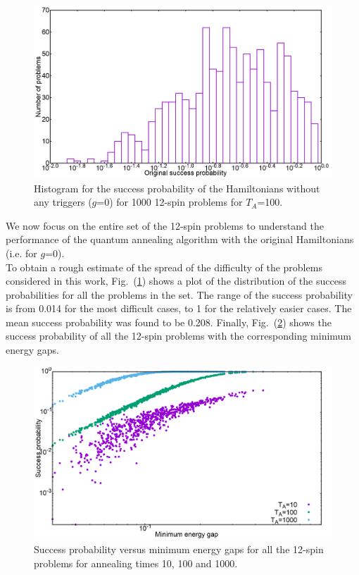 \documentclass[../main.tex]{subfiles}
\begin{document}
\begin{figure}[H]
\centering 
\includegraphics[scale=0.24]{O_s12_T100_g0.png}
\caption{Histogram for the success probability of the Hamiltonians without any triggers ($g$=0) for 1000 12-spin problems for $T_A$=100.}
\label{fig:o8}
\end{figure}
We now focus on the entire set of the 12-spin problems to understand the performance of the quantum annealing algorithm with the original Hamiltonians (i.e. for $g$=0).\\
To obtain a rough estimate of the spread of the difficulty of the problems considered in this work, Fig.~(\ref{fig:o8}) shows a plot of the distribution of the success probabilities for all the problems in the set. The range of the success probability is from 0.014 for the most difficult cases, to 1 for the relatively easier cases. The mean success probability was found to be 0.208. 
Finally, Fig.~(\ref{fig:o10}) shows the success probability of all the 12-spin problems with the corresponding minimum energy gaps.
\begin{figure}[H]
\centering 
\includegraphics[scale=0.24]{GapVsSucc_s12_T10_100_1000.png}
\caption{Success probability versus minimum energy gaps for all the 12-spin problems for annealing times 10, 100 and 1000.}
\label{fig:o10}
\end{figure}
\end{document}
